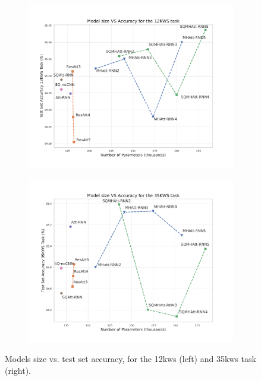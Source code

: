 \begin{figure}
	\centering
	\begin{subfigure}{.5\textwidth}
		\centering
		\includegraphics[width=\linewidth]{imgs/size_vs_accuracy12.pdf}
		\label{fig:sub1}
	\end{subfigure}%
	\begin{subfigure}{.5\textwidth}
		\centering
		\includegraphics[width=\linewidth]{imgs/size_vs_accuracy35.pdf}
		\label{fig:sub2}
	\end{subfigure}
	\caption{Models size vs. test set accuracy, for the 12kws (left) and 35kws task (right).}
	\label{fig:accs_vs_parameters}
\end{figure}

